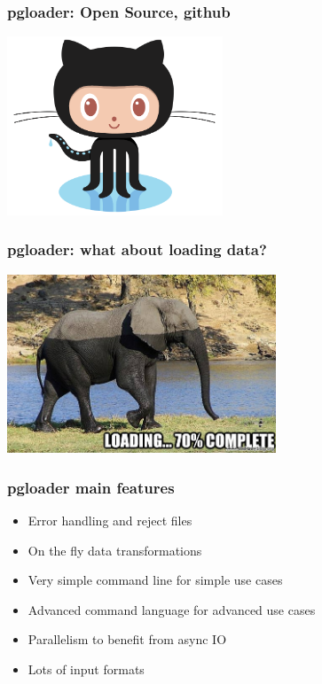\documentclass{beamer}
\begin{document}
\begin{frame}
  \frametitle{pgloader: Open Source, github}


  \begin{center}
    \includegraphics[height=2.1in]{Octocat.png}
  \end{center}
\end{frame}

\begin{frame}
  \frametitle{pgloader: what about loading data?}


  \begin{center}
    \includegraphics[height=2.1in]{elephant-loading.jpg}
  \end{center}
\end{frame}

\begin{frame}[fragile]
  \frametitle{pgloader main features}

  \vfill
  
  \begin{itemize}
  \item Error handling and reject files
  \item On the fly data transformations
  \item Very simple command line for simple use cases
  \item Advanced command language for advanced use cases
  \item Parallelism to benefit from async IO
  \item Lots of input formats
  \end{itemize}  
\end{frame}
\end{document}
